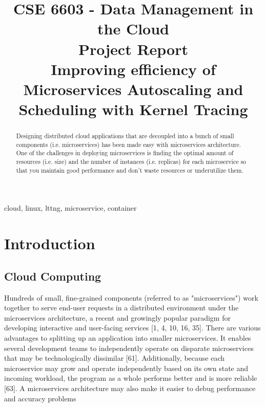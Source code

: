 \documentclass[conference]{IEEEtran}
\begin{document}
\title{CSE 6603 - Data Management in the Cloud \\ Project Report \\ Improving efficiency of Microservices Autoscaling and Scheduling with Kernel Tracing}

\author{
\and
\and
}

\maketitle

\begin{abstract}
Designing distributed cloud applications that are decoupled into a bunch of small components (i.e. microservices) has been made easy with microservices architecture. One of the challenges in deploying microservices is finding the optimal amount of resources (i.e. size) and the number of instances (i.e. replicas) for each microservice so that you maintain good performance and don't waste resources or underutilize them. 
\end{abstract}

\begin{IEEEkeywords}
    cloud, linux, lttng, microservice, container
\end{IEEEkeywords}

\section{Introduction}
\subsection{Cloud Computing}
Hundreds of small, fine-grained components (referred to as "microservices") work together to serve end-user requests in a distributed environment under the microservices architecture, a recent and growingly popular paradigm for developing interactive and user-facing services [1, 4, 10, 16, 35]. There are various advantages to splitting up an application into smaller microservices. It enables several development teams to independently operate on disparate microservices that may be technologically dissimilar [61]. Additionally, because each microservice may grow and operate independently based on its own state and incoming workload, the program as a whole performs better and is more reliable [63]. A microservices architecture may also make it easier to debug performance and accuracy problems \cite{b54}
\end{document}
